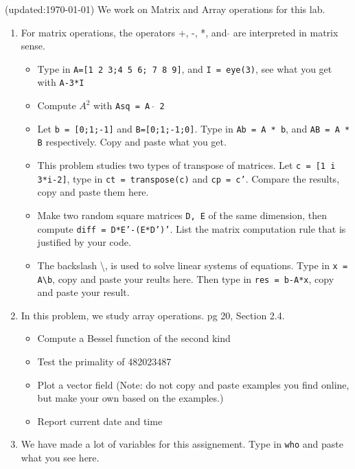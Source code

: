 \documentclass[12pt]{article}
\begin{document}
(updated:\today) We work on Matrix and Array operations for this lab.

\begin{enumerate}
\item For matrix operations, the operators +, -, *, and $\widehat{}$ are interpreted in matrix sense.
\begin{itemize}
\item Type in {\tt A=[1 2 3;4 5 6; 7 8 9]}, and {\tt I = eye(3)}, see what you get with {\tt A-3*I}
\item Compute $A^2$ with {\tt Asq = A $\widehat{}$ 2} 
\item Let {\tt b = [0;1;-1]} and {\tt B=[0;1;-1;0]}. Type in {\tt Ab = A * b}, and {\tt AB = A * B} respectively. Copy and paste what you get.
\item This problem studies two types of transpose of matrices. Let {\tt c = [1 i 3*i-2]}, type in {\tt ct = transpose(c)} and {\tt cp = c'}. Compare the results, copy and paste them here.
\item Make two random square matrices {\tt D, E} of the same dimension, then compute {\tt diff = D*E'-(E*D')'}. List the matrix computation rule that is justified by your code.
\item The backslash \textbackslash, is used to solve linear systems of equations. Type in {\tt x = A\textbackslash b}, copy and paste your reults here. Then type in {\tt res = b-A*x}, copy and paste your result.
\end{itemize}
\item In this problem, we study array operations. pg 20, Section 2.4.

\begin{itemize}
\item Compute a Bessel function of the second kind 
\item Test the primality of 482023487
\item Plot a vector field (Note: do not copy and paste examples you find online, but make your own based on the examples.) 
\item Report current date and time

\end{itemize}


\item We have made a lot of variables for this assignement. Type in {\tt who} and paste what you see here.









\end{enumerate}
\end{document}
